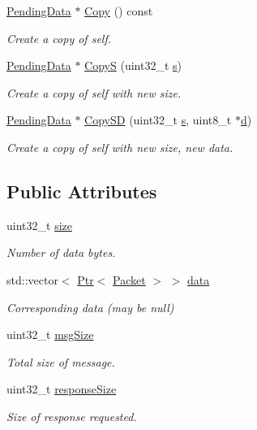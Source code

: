 \begin{DoxyCompactItemize}
\hyperlink{classns3_1_1PendingData}{Pending\+Data} $\ast$ \hyperlink{classns3_1_1PendingData_aab33a24a6ab75995d6f152f6112356c6}{Copy} () const 
\begin{DoxyCompactList}\small\item\em Create a copy of self. \end{DoxyCompactList}\item 
\hyperlink{classns3_1_1PendingData}{Pending\+Data} $\ast$ \hyperlink{classns3_1_1PendingData_ab6702eac0df0e475b6932ea8bdd3999e}{CopyS} (uint32\+\_\+t \hyperlink{generate__test__data__lte__sinr_8m_ad83eeb3a142285d1243a08c6b7026df8}{s})
\begin{DoxyCompactList}\small\item\em Create a copy of self with new size. \end{DoxyCompactList}\item 
\hyperlink{classns3_1_1PendingData}{Pending\+Data} $\ast$ \hyperlink{classns3_1_1PendingData_ac4501d658957228054461ec3e6ec6468}{Copy\+SD} (uint32\+\_\+t \hyperlink{generate__test__data__lte__sinr_8m_ad83eeb3a142285d1243a08c6b7026df8}{s}, uint8\+\_\+t $\ast$\hyperlink{lte__pathloss_8m_a1aabac6d068eef6a7bad3fdf50a05cc8}{d})
\begin{DoxyCompactList}\small\item\em Create a copy of self with new size, new data. \end{DoxyCompactList}\end{DoxyCompactItemize}
\subsection*{Public Attributes}
\begin{DoxyCompactItemize}
\item 
uint32\+\_\+t \hyperlink{classns3_1_1PendingData_a7ab8727ea8af4328619add818c858208}{size}
\begin{DoxyCompactList}\small\item\em Number of data bytes. \end{DoxyCompactList}\item 
std\+::vector$<$ \hyperlink{classns3_1_1Ptr}{Ptr}$<$ \hyperlink{classns3_1_1Packet}{Packet} $>$ $>$ \hyperlink{classns3_1_1PendingData_ab6ccbe1d5ca0d4536e4ad454971eb460}{data}
\begin{DoxyCompactList}\small\item\em Corresponding data (may be null) \end{DoxyCompactList}\item 
uint32\+\_\+t \hyperlink{classns3_1_1PendingData_a2a75f456906faa288dd2ca409042173e}{msg\+Size}
\begin{DoxyCompactList}\small\item\em Total size of message. \end{DoxyCompactList}\item 
uint32\+\_\+t \hyperlink{classns3_1_1PendingData_a279ab96448f59ee2845c75e34cfad717}{response\+Size}
\begin{DoxyCompactList}\small\item\em Size of response requested. \end{DoxyCompactList}\end{DoxyCompactItemize}


